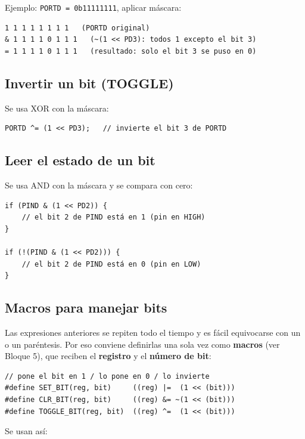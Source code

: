 Ejemplo: \texttt{PORTD = 0b11111111}, aplicar máscara:

\begin{lstlisting}[style=estilo-c]
  1 1 1 1 1 1 1 1   (PORTD original)
& 1 1 1 1 0 1 1 1   (~(1 << PD3): todos 1 excepto el bit 3)
= 1 1 1 1 0 1 1 1   (resultado: solo el bit 3 se puso en 0)
\end{lstlisting}

\subsection{Invertir un bit (TOGGLE)}

Se usa XOR con la máscara:

\begin{lstlisting}[style=estilo-c]
PORTD ^= (1 << PD3);   // invierte el bit 3 de PORTD
\end{lstlisting}

\subsection{Leer el estado de un bit}

Se usa AND con la máscara y se compara con cero:

\begin{lstlisting}[style=estilo-c]
if (PIND & (1 << PD2)) {
    // el bit 2 de PIND está en 1 (pin en HIGH)
}

if (!(PIND & (1 << PD2))) {
    // el bit 2 de PIND está en 0 (pin en LOW)
}
\end{lstlisting}

\subsection{Macros para manejar bits}

Las expresiones anteriores se repiten todo el tiempo y es fácil equivocarse con un
\texttt{} o un paréntesis. Por eso conviene definirlas una sola vez como
\textbf{macros} (ver Bloque 5), que reciben el \textbf{registro} y el \textbf{número de bit}:

\begin{lstlisting}[style=estilo-c]
// pone el bit en 1 / lo pone en 0 / lo invierte
#define SET_BIT(reg, bit)     ((reg) |=  (1 << (bit)))
#define CLR_BIT(reg, bit)     ((reg) &= ~(1 << (bit)))
#define TOGGLE_BIT(reg, bit)  ((reg) ^=  (1 << (bit)))
\end{lstlisting}

Se usan así:

